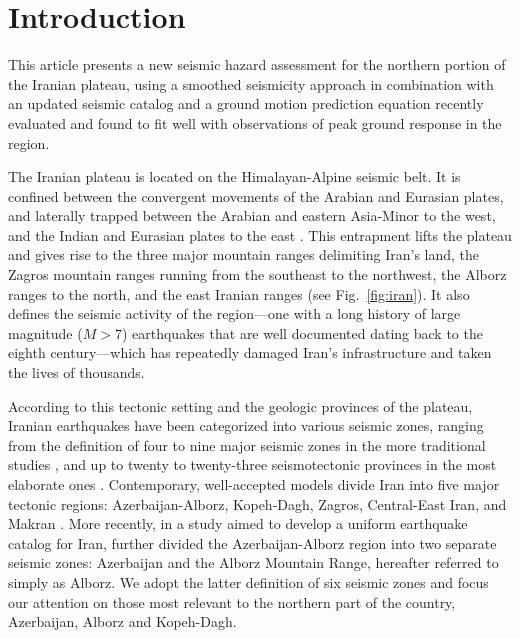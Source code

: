 
\section{Introduction}

This article presents a new seismic hazard assessment for the northern portion of the Iranian plateau, using a smoothed seismicity approach in combination with an updated seismic catalog and a ground motion prediction equation recently evaluated and found to fit well with observations of peak ground response in the region.

The Iranian plateau is located on the Himalayan-Alpine seismic belt. It is confined between the convergent movements of the Arabian and Eurasian plates, and laterally trapped between the Arabian and eastern Asia-Minor to the west, and the Indian and Eurasian plates to the east \citep{Berberian_1981_Chap}. This entrapment lifts the plateau and gives rise to the three major mountain ranges delimiting Iran's land, the Zagros mountain ranges running from the southeast to the northwest, the Alborz ranges to the north, and the east Iranian ranges (see Fig.~\ref{fig:iran}). It also defines the seismic activity of the region---one with a long history of large magnitude ($M>7$) earthquakes that are well documented dating back to the eighth century---which has repeatedly damaged Iran's infrastructure and taken the lives of thousands.

According to this tectonic setting and the geologic provinces of the plateau, Iranian earthquakes have been categorized into various seismic zones, ranging from the definition of four to nine major seismic zones in the more traditional studies \citep[e.g.,][]{Stocklin1968, Takin1972, Berberian1976}, and up to twenty to twenty-three seismotectonic provinces in the most elaborate ones \citep[e.g.,][]{Nowroozi1976, Tavakoli1999}. Contemporary, well-accepted models divide Iran into five major tectonic regions: Azerbaijan-Alborz, Kopeh-Dagh, Zagros, Central-East Iran, and Makran \citep[e.g.,][]{Mirzaei1998}. More recently, in a study aimed to develop a uniform earthquake catalog for Iran, \citet{Karimiparidari2013} further divided the Azerbaijan-Alborz region into two separate seismic zones: Azerbaijan and the Alborz Mountain Range, hereafter referred to simply as Alborz. We adopt the latter definition of six seismic zones and focus our attention on those most relevant to the northern part of the country, Azerbaijan, Alborz and Kopeh-Dagh.

